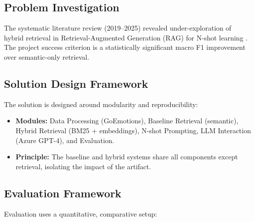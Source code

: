 \subsection{Problem Investigation}
The systematic literature review (2019–2025) revealed under-exploration of hybrid retrieval in Retrieval-Augmented Generation (RAG) for N-shot learning \cite{lewis2020retrieval,karpukhin2020dense}. The project success criterion is a statistically significant macro F1 improvement over semantic-only retrieval.

\subsection{Solution Design Framework}
The solution is designed around modularity and reproducibility:

\begin{itemize}
    \item \textbf{Modules:} Data Processing (GoEmotions), Baseline Retrieval (semantic), Hybrid Retrieval (BM25 + embeddings), N-shot Prompting, LLM Interaction (Azure GPT-4), and Evaluation.
    \item \textbf{Principle:} The baseline and hybrid systems share all components except retrieval, isolating the impact of the artifact.
\end{itemize}

\subsection{Evaluation Framework}
Evaluation uses a quantitative, comparative setup:

